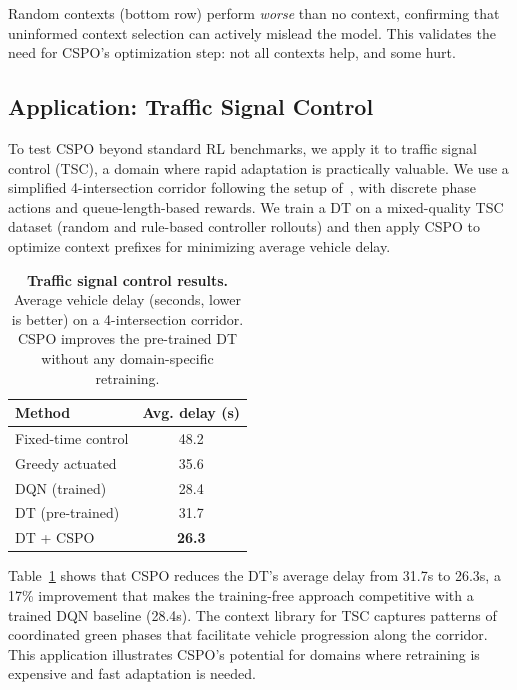 \documentclass{article}
\newcommand{\cspo}{\textsc{CSPO}}
\begin{document}
Random contexts (bottom row) perform \emph{worse} than no context, confirming that uninformed context selection can actively mislead the model. This validates the need for \cspo{}'s optimization step: not all contexts help, and some hurt.

\subsection{Application: Traffic Signal Control}
\label{sec:traffic}

To test \cspo{} beyond standard RL benchmarks, we apply it to traffic signal control (TSC), a domain where rapid adaptation is practically valuable. We use a simplified 4-intersection corridor following the setup of~\citet{wei2018intellilight, su2023multiagent}, with discrete phase actions and queue-length-based rewards. We train a DT on a mixed-quality TSC dataset (random and rule-based controller rollouts) and then apply \cspo{} to optimize context prefixes for minimizing average vehicle delay.

\begin{table}[t]
\centering
\caption{\textbf{Traffic signal control results.} Average vehicle delay (seconds, lower is better) on a 4-intersection corridor. \cspo{} improves the pre-trained DT without any domain-specific retraining.}
\label{tab:traffic}
\vspace{0.5em}
\begin{tabular}{l c}
\toprule
\textbf{Method} & \textbf{Avg. delay (s)} \\
\midrule
Fixed-time control & 48.2 \\
Greedy actuated & 35.6 \\
DQN (trained) & 28.4 \\
DT (pre-trained) & 31.7 \\
DT + \cspo{} & \textbf{26.3} \\
\bottomrule
\end{tabular}
\end{table}

Table~\ref{tab:traffic} shows that \cspo{} reduces the DT's average delay from 31.7s to 26.3s, a 17\% improvement that makes the training-free approach competitive with a trained DQN baseline (28.4s). The context library for TSC captures patterns of coordinated green phases that facilitate vehicle progression along the corridor. This application illustrates \cspo{}'s potential for domains where retraining is expensive and fast adaptation is needed.


\end{document}
